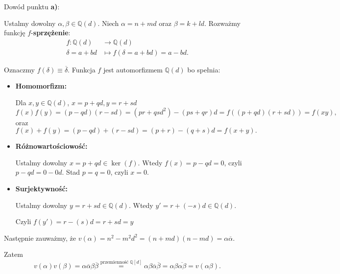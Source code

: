 \begin{solution}
\noindent Dowód punktu \textbf{a)}:

Ustalmy dowolny $\alpha, \beta \in \mathbb{Q} \left( d \right) $. Niech $\alpha = n + md$ oraz $\beta = k + ld$. Rozważmy funkcję $f$-\textbf{sprzężenie}:
\begin{align*}
	f: \mathbb{Q} \left( d \right)  &\longrightarrow \mathbb{Q} \left( d \right)  \\
	\delta = a + bd &\longmapsto f(\delta = a + bd) = a - bd
.\end{align*}

Oznaczmy $f\left( \delta \right) \equiv \overline{\delta}$. Funkcja $f$ jest automorfizmem $\mathbb{Q} \left( d \right) $ bo spełnia:
\begin{itemize}
	\item \textbf{Homomorfizm:}

		Dla $x,y \in \mathbb{Q} \left( d \right) $, $x = p +qd, y = r + sd$
		 \[
		f\left( x \right) f\left( y \right) = \left( p-qd \right) \left( r-sd \right) = \left( pr + qsd^2 \right) - \left( ps +qr \right)d = f\left( \left( p+qd \right)\left( r+sd \right)  \right) = f\left( xy \right) 
		,\] 
		oraz 
		 \[
		 f\left( x \right) + f\left( y \right) = \left( p-qd \right) + \left( r - sd \right) = \left( p+r \right) - \left( q+s \right)d = f\left( x + y \right) 
		 .\] 
	\item \textbf{Różnowartościowość:} 

		Ustalmy dowolny $x = p +qd \in \ker(f) $. Wtedy $f\left( x \right) = p - qd = 0$, czyli  $p-qd = 0 - 0d$. Stad  $p=q=0$, czyli  $x=0$.
	\item \textbf{Surjektywność:}

		Ustalmy dowolny $y = r + sd \in \mathbb{Q} \left( d \right) $. Wtedy $y' = r +\left( -s \right) d \in \mathbb{Q}\left( d \right) $.

		Czyli $f\left( y' \right) = r - \left( s \right) d = r + sd = y $
\end{itemize}

Następnie zauważmy, że $v\left( \alpha  \right) = n^2-m^2d^2 = \left(n + md\right)\left( n-md \right) = \alpha \overline{\alpha }$.

Zatem 
\[
v\left( \alpha  \right) v\left( \beta  \right) = \alpha \overline{\alpha }\beta \overline{\beta } \overset{\text{przemienność }\mathbb{Q} \left[ d \right] }{=} \alpha \beta \overline{\alpha }\overline{\beta } = \alpha \beta \overline{\alpha \beta } = v\left( \alpha \beta  \right) 
.\] 


\end{solution}
